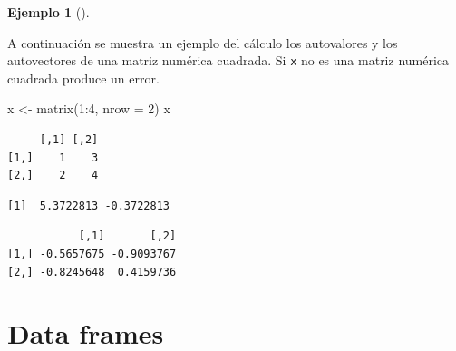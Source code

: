 \documentclass[
  a4paper,
]{scrreport}
\newenvironment{Shaded}{\begin{snugshade}}{\end{snugshade}}
\newcommand{\AttributeTok}[1]{\textcolor[rgb]{0.40,0.45,0.13}{#1}}
\newcommand{\CommentTok}[1]{\textcolor[rgb]{0.37,0.37,0.37}{#1}}
\newcommand{\DecValTok}[1]{\textcolor[rgb]{0.68,0.00,0.00}{#1}}
\newcommand{\FunctionTok}[1]{\textcolor[rgb]{0.28,0.35,0.67}{#1}}
\newcommand{\NormalTok}[1]{\textcolor[rgb]{0.00,0.23,0.31}{#1}}
\newcommand{\OtherTok}[1]{\textcolor[rgb]{0.00,0.23,0.31}{#1}}
\newcommand{\SpecialCharTok}[1]{\textcolor[rgb]{0.37,0.37,0.37}{#1}}
\theoremstyle{definition}
\newtheorem{example}{Ejemplo}[chapter]
\theoremstyle{definition}
\theoremstyle{remark}
\begin{document}
\leavevmode{}%
\begin{example}[]\label{exm-autovalores-autovectores}

A continuación se muestra un ejemplo del cálculo los autovalores y los
autovectores de una matriz numérica cuadrada. Si \texttt{x} no es una
matriz numérica cuadrada produce un error.

\begin{Shaded}
\begin{Highlighting}[]
\NormalTok{x }\OtherTok{\textless{}{-}} \FunctionTok{matrix}\NormalTok{(}\DecValTok{1}\SpecialCharTok{:}\DecValTok{4}\NormalTok{, }\AttributeTok{nrow =} \DecValTok{2}\NormalTok{)}
\NormalTok{x}
\end{Highlighting}
\end{Shaded}

\begin{verbatim}
     [,1] [,2]
[1,]    1    3
[2,]    2    4
\end{verbatim}

\begin{Shaded}
\end{Shaded}

\begin{verbatim}
[1]  5.3722813 -0.3722813
\end{verbatim}

\begin{Shaded}
\end{Shaded}

\begin{verbatim}
           [,1]       [,2]
[1,] -0.5657675 -0.9093767
[2,] -0.8245648  0.4159736
\end{verbatim}

\end{example}

\hypertarget{data-frames}{%
\section{Data frames}\label{data-frames}}
\end{document}

